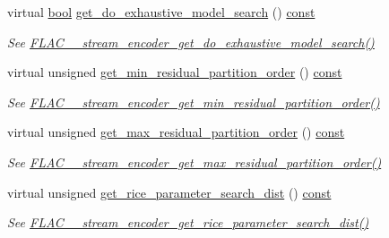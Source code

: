 \begin{DoxyCompactItemize}
virtual \hyperlink{mac_2config_2i386_2lib-src_2libsoxr_2soxr-config_8h_abb452686968e48b67397da5f97445f5b}{bool} \hyperlink{class_f_l_a_c_1_1_encoder_1_1_stream_ab15b58ec46326ae1830b484caba20357}{get\+\_\+do\+\_\+exhaustive\+\_\+model\+\_\+search} () \hyperlink{getopt1_8c_a2c212835823e3c54a8ab6d95c652660e}{const} 
\begin{DoxyCompactList}\small\item\em See \hyperlink{group__flac__stream__encoder_gad429e31c7062baff987571d935b889f4}{F\+L\+A\+C\+\_\+\+\_\+stream\+\_\+encoder\+\_\+get\+\_\+do\+\_\+exhaustive\+\_\+model\+\_\+search()} \end{DoxyCompactList}\item 
virtual unsigned \hyperlink{class_f_l_a_c_1_1_encoder_1_1_stream_a4e15e42359a89b6252c0bae8d7dac952}{get\+\_\+min\+\_\+residual\+\_\+partition\+\_\+order} () \hyperlink{getopt1_8c_a2c212835823e3c54a8ab6d95c652660e}{const} 
\begin{DoxyCompactList}\small\item\em See \hyperlink{group__flac__stream__encoder_gace80859226b77f40b7b06314b26aa478}{F\+L\+A\+C\+\_\+\+\_\+stream\+\_\+encoder\+\_\+get\+\_\+min\+\_\+residual\+\_\+partition\+\_\+order()} \end{DoxyCompactList}\item 
virtual unsigned \hyperlink{class_f_l_a_c_1_1_encoder_1_1_stream_a61b3a6d9c70f04a66ae9104226c5bc62}{get\+\_\+max\+\_\+residual\+\_\+partition\+\_\+order} () \hyperlink{getopt1_8c_a2c212835823e3c54a8ab6d95c652660e}{const} 
\begin{DoxyCompactList}\small\item\em See \hyperlink{group__flac__stream__encoder_ga8f96ce37192b7d062394d710fc01b59e}{F\+L\+A\+C\+\_\+\+\_\+stream\+\_\+encoder\+\_\+get\+\_\+max\+\_\+residual\+\_\+partition\+\_\+order()} \end{DoxyCompactList}\item 
virtual unsigned \hyperlink{class_f_l_a_c_1_1_encoder_1_1_stream_aacc9cede77a934c4cc8d262f88ed7d6e}{get\+\_\+rice\+\_\+parameter\+\_\+search\+\_\+dist} () \hyperlink{getopt1_8c_a2c212835823e3c54a8ab6d95c652660e}{const} 
\begin{DoxyCompactList}\small\item\em See \hyperlink{group__flac__stream__encoder_ga6780c051c176a3dcc4dd1a83a6309bd7}{F\+L\+A\+C\+\_\+\+\_\+stream\+\_\+encoder\+\_\+get\+\_\+rice\+\_\+parameter\+\_\+search\+\_\+dist()} \end{DoxyCompactList}\item 

\end{DoxyCompactItemize}
